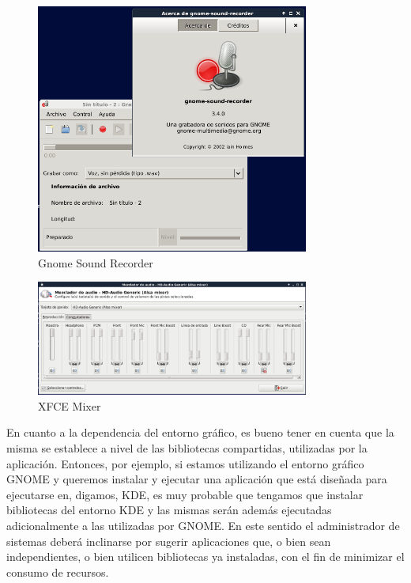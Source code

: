 \documentclass[12pt]{article}
\begin{document}
\begin{figure}[h]
\centering
\includegraphics[width=0.8\textwidth]{gnomerec.png}
\renewcommand{\figurename}{Fig.}
\caption{Gnome Sound Recorder}
\label{contexto:figura}
\end{figure}


\begin{figure}[h]
\centering
\includegraphics[width=0.8\textwidth]{xfcemix.png}
\renewcommand{\figurename}{Fig.}
\caption{XFCE Mixer}
\label{contexto:figura}
\end{figure}

En cuanto a la dependencia del entorno gráfico, es bueno tener en cuenta que 
la misma se establece a nivel de las bibliotecas compartidas, utilizadas
por la aplicación. Entonces, por ejemplo, si estamos utilizando el entorno gráfico 
GNOME y queremos instalar y ejecutar una aplicación que está diseñada para 
ejecutarse en, digamos, KDE, es muy probable que tengamos que instalar 
bibliotecas del entorno KDE y las mismas serán además ejecutadas adicionalmente 
a las utilizadas por GNOME. En este sentido el administrador de sistemas deberá 
inclinarse por sugerir aplicaciones que, o bien sean independientes, o bien 
utilicen bibliotecas ya instaladas, con el fin de minimizar el consumo de 
recursos. 
\end{document}

